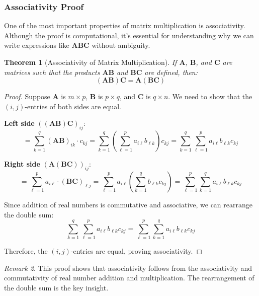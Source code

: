 \documentclass[12pt]{article}
\numberwithin{equation}{section}
\newcommand{\mat}[1]{\mathbf{#1}}        %
\theoremstyle{plain}
\newtheorem{theorem}{Theorem}[section]
\theoremstyle{definition}
\theoremstyle{remark}
\newtheorem{remark}[theorem]{Remark}
\begin{document}
\subsubsection{Associativity Proof}

One of the most important properties of matrix multiplication is associativity. Although the proof is computational, it's essential for understanding why we can write expressions like $\mat{A}\mat{B}\mat{C}$ without ambiguity.

\begin{theorem}[Associativity of Matrix Multiplication]
If $\mat{A}$, $\mat{B}$, and $\mat{C}$ are matrices such that the products $\mat{A}\mat{B}$ and $\mat{B}\mat{C}$ are defined, then:
$$(\mat{A}\mat{B})\mat{C} = \mat{A}(\mat{B}\mat{C})$$
\end{theorem}

\begin{proof}
Suppose $\mat{A}$ is $m \times p$, $\mat{B}$ is $p \times q$, and $\mat{C}$ is $q \times n$. We need to show that the $(i,j)$-entries of both sides are equal.

\textbf{Left side} $((\mat{A}\mat{B})\mat{C})_{ij}$:
$$= \sum_{k=1}^q (\mat{A}\mat{B})_{ik} \cdot c_{kj} = \sum_{k=1}^q \left(\sum_{\ell=1}^p a_{i\ell}b_{\ell k}\right) c_{kj} = \sum_{k=1}^q \sum_{\ell=1}^p a_{i\ell}b_{\ell k}c_{kj}$$

\textbf{Right side} $(\mat{A}(\mat{B}\mat{C}))_{ij}$:
$$= \sum_{\ell=1}^p a_{i\ell} \cdot (\mat{B}\mat{C})_{\ell j} = \sum_{\ell=1}^p a_{i\ell} \left(\sum_{k=1}^q b_{\ell k}c_{kj}\right) = \sum_{\ell=1}^p \sum_{k=1}^q a_{i\ell}b_{\ell k}c_{kj}$$

Since addition of real numbers is commutative and associative, we can rearrange the double sum:
$$\sum_{k=1}^q \sum_{\ell=1}^p a_{i\ell}b_{\ell k}c_{kj} = \sum_{\ell=1}^p \sum_{k=1}^q a_{i\ell}b_{\ell k}c_{kj}$$

Therefore, the $(i,j)$-entries are equal, proving associativity.
\end{proof}

\begin{remark}
This proof shows that associativity follows from the associativity and commutativity of real number addition and multiplication. The rearrangement of the double sum is the key insight.
\end{remark}
\end{document}
